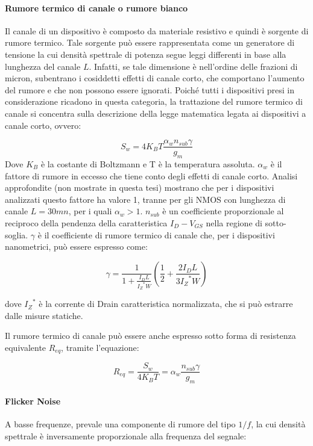 \paragraph*{Rumore termico di canale o rumore bianco}
Il canale di un dispositivo è composto da materiale resistivo e quindi è sorgente di rumore termico. Tale sorgente può essere rappresentata come un generatore di tensione la cui densità spettrale di potenza segue leggi differenti in base alla lunghezza del canale $L$.  Infatti, se tale dimensione è nell'ordine delle frazioni di micron, subentrano i cosiddetti effetti di canale corto, che comportano l'aumento del rumore e che non possono essere ignorati.
Poiché tutti i dispositivi presi in considerazione ricadono in questa categoria, la trattazione del rumore termico di canale si concentra sulla descrizione della legge matematica legata ai dispositivi a canale corto, ovvero:

\begin{equation}
  S_w = 4 K_B T \frac{\alpha_w n_{sub} \gamma}{g_m}
\end{equation}
Dove $K_B$ è la costante di Boltzmann e T è la temperatura assoluta. $\alpha_w$ è il fattore di rumore in eccesso che tiene conto degli effetti di canale corto. Analisi approfondite (non mostrate in questa tesi) mostrano che per i dispositivi analizzati questo fattore ha valore 1, tranne per gli NMOS con lunghezza di canale $L = 30mn$, per i quali $\alpha_w > 1$. $n_{sub}$ è un coefficiente proporzionale al reciproco della pendenza della caratteristica $I_D-V_{GS}$ nella regione di sotto-soglia. $\gamma$ è il coefficiente di rumore termico di canale che, per i dispositivi nanometrici, può essere espresso come:

\begin{equation}
  \gamma = \frac{1}{1 +  \frac {I_D L}{{I_Z}^* W}}\left(\frac{1}{2} + \frac{ 2 I_D L}{3 {I_Z}^* W}\right)
\end{equation}

dove ${I_Z}^*$ è la corrente di Drain caratteristica normalizzata, che si può estrarre dalle misure statiche.

Il rumore termico di canale può essere anche espresso sotto forma di resistenza equivalente $R_{eq}$, tramite l'equazione:

\begin{equation}
  R_{eq} = \frac{S_w}{4 K_B T} = \alpha_w \frac{n_{sub} \gamma}{g_m}
\end{equation}

\paragraph*{Flicker Noise}
A basse frequenze, prevale una componente di rumore del tipo $1/f$, la cui densità spettrale è inversamente proporzionale alla frequenza del segnale:

